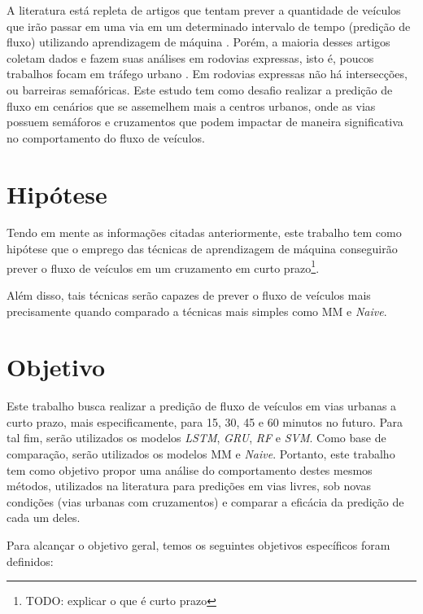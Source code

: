A literatura está repleta de artigos que tentam prever a quantidade de veículos que irão passar em uma via em um determinado intervalo de tempo (predição de fluxo) utilizando aprendizagem de máquina \cite{doi:10.1080/01441647.2014.992496, fu2016using, hamed_prediction_1995, lv_6894591, Seoul, wang_2018, Xiaolei_2015, Zainab_2018}. Porém, a maioria desses artigos coletam dados e fazem suas análises em rodovias expressas, isto é, poucos trabalhos focam em tráfego urbano \cite{lana_2018}. Em rodovias expressas não há intersecções, ou barreiras semafóricas. Este estudo tem como desafio realizar a predição de fluxo em cenários que se assemelhem mais a centros urbanos, onde as vias possuem semáforos e cruzamentos que podem impactar de maneira significativa no comportamento do fluxo de veículos.

\section{Hipótese}

Tendo em mente as informações citadas anteriormente, este trabalho tem como hipótese que o emprego das técnicas de aprendizagem de máquina conseguirão prever o fluxo de veículos em um cruzamento em curto prazo\footnote{TODO: explicar o que é curto prazo}. 

Além disso, tais técnicas serão capazes de prever o fluxo de veículos mais precisamente quando comparado a técnicas mais simples como \acrfull{MM} e \textit{Naive}.

\section{Objetivo}

Este trabalho busca realizar a predição de fluxo de veículos em vias urbanas a curto prazo, mais especificamente, para 15, 30, 45 e 60 minutos no futuro. Para tal fim, serão utilizados os modelos \textit{\acrfull{LSTM}}, \textit{\acrfull{GRU}}, \textit{\acrfull{RF}} e \textit{\acrfull{SVM}}. Como base de comparação, serão utilizados os modelos \acrfull{MM} e \textit{Naive}. Portanto, este trabalho tem como objetivo propor uma análise do comportamento destes mesmos métodos, utilizados na literatura para predições em vias livres, sob novas condições (vias urbanas com cruzamentos) e comparar a eficácia da predição de cada um deles.

Para alcançar o objetivo geral, temos os seguintes objetivos específicos foram definidos:

